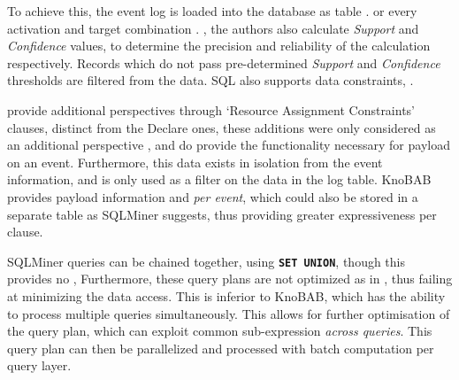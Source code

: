 To achieve this, the event log is  loaded into the database as table . or every activation and target combination . , the authors also calculate \emph{Support} and \emph{Confidence} values, to determine the precision and reliability of the calculation respectively. Records which do not pass pre-determined \emph{Support} and \emph{Confidence} thresholds are filtered from the data.  SQL also supports data constraints, .

 provide additional  perspectives through `Resource Assignment Constraints' clauses, distinct from the Declare ones, these additions were only considered as an additional perspective , and do provide the functionality necessary for payload on an event. Furthermore, this data exists in isolation from the event information, and is only used as a filter on the data in the log table. KnoBAB provides payload information  and \emph{per event}, which could also be stored in a separate table as SQLMiner suggests, thus providing greater expressiveness per clause.

SQLMiner queries can be chained together, using \texttt{\textbf{SET UNION}}, though this provides no , Furthermore, these query plans are not optimized as in \cite{BellatrecheKB21}, thus failing at minimizing the data access. This is inferior to KnoBAB, which has the ability to process multiple queries simultaneously. This allows for further optimisation of the query plan, which can exploit common sub-expression \emph{across queries}. This query plan can then be parallelized and processed with batch computation per query layer.
